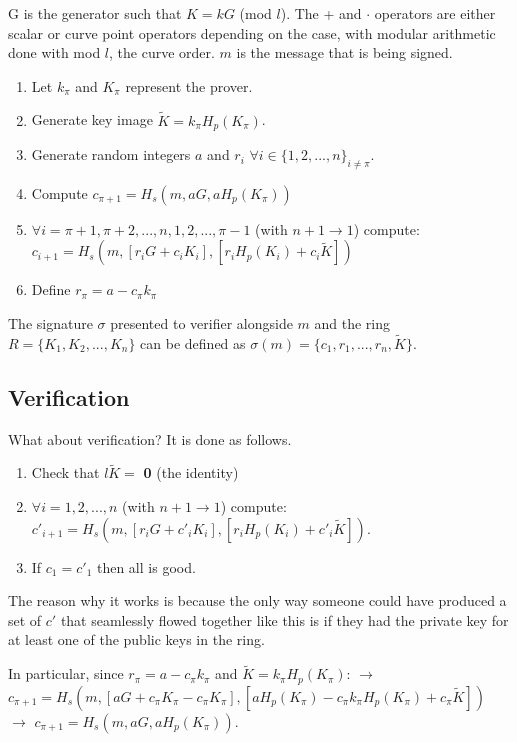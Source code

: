 \documentclass[9pt]{article}
\begin{document}
G is the generator such that $K = k G$ (mod $l$). The + and $\cdot$ operators are either scalar or curve point operators depending on the case, with modular arithmetic done with mod $l$, the curve order. $m$ is the message that is being signed.

\begin{enumerate}
    \item Let $k_\pi$ and $K_\pi$ represent the prover.
    \item Generate key image $\tilde{K} = k_\pi H_p(K_\pi)$.
    \item Generate random integers $a$ and $r_i$ $\forall i \in \{1, 2, ..., n\}_{i\neq\pi}$.
    \item Compute $c_{\pi+1} = H_s(m, aG, aH_p(K_\pi))$
    \item $\forall i = \pi+1, \pi+2, ..., n, 1, 2, ..., \pi-1$ (with $n + 1 \rightarrow 1$) compute: \newline $c_{i+1} = H_s(m, [r_i G + c_i K_i], [r_i H_p(K_i) + c_i  \tilde{K}])$
    \item Define $r_\pi = a - c_\pi k_\pi$
\end{enumerate}


The signature $\sigma$ presented to verifier alongside $m$ and the ring $R = \{K_1, K_2, ..., K_n\}$ can be defined as $\sigma(m) = \{c_1, r_1, ..., r_n, \tilde{K}\}$.

\subsection{Verification}\label{math:verification}

What about verification? It is done as follows.

\begin{enumerate}
    \item Check that $l\tilde{K} =$ \textbf{0} (the identity)
    \item $\forall i = 1, 2, ..., n$ (with $n + 1 \rightarrow 1$) compute: \newline $c'_{i+1} = H_s(m, [r_i G + c'_i K_i], [r_i H_p(K_i) + c'_i \tilde{K}])$.
    \item If $c_1 = c'_1$ then all is good.
\end{enumerate}

The reason why it works is because the only way someone could have produced a set of $c'$ that seamlessly flowed together like this is if they had the private key for at least one of the public keys in the ring. 

In particular, since $r_\pi = a - c_\pi k_\pi$ and $\tilde{K} = k_\pi H_p (K_\pi)$: \newline $\rightarrow$ $c_{\pi + 1} = H_s(m, [aG + c_\pi K_\pi - c_\pi K_\pi ], [a H_p(K_\pi) - c_\pi k_\pi H_p(K_\pi) + c_\pi \tilde{K}])$ \newline $\rightarrow$ $c_{\pi + 1} =  H_s(m, aG, aH_p(K_\pi))$.
\end{document}
